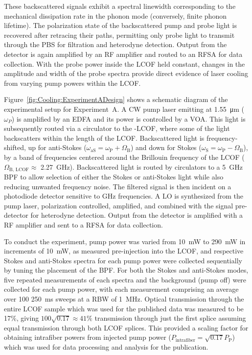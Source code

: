 These backscattered signals exhibit a spectral linewidth corresponding to the mechanical dissipation rate in the phonon mode (conversely, finite phonon lifetime). The polarization state of the backscattered pump and probe light is recovered after retracing their paths, permitting only probe light to transmit through the \ac{PBS} for filtration and heterodyne detection. Output from the detector is again amplified by an \ac{RF} amplifier and routed to an \ac{RFSA} for data collection. With the probe power inside the \ac{LCOF} held constant, changes in the amplitude and width of the probe spectra provide direct evidence of laser cooling from varying pump powers within the \ac{LCOF}.

Figure~\ref{fig:Cooling:ExperimentADesign} shows a schematic diagram of the experimental setup for Experiment~A. A \ac{CW} pump laser emitting at \SI{1.55}{\micro\meter} (\(\omega_{P}\)) is amplified by an \ac{EDFA} and its power is controlled by a \ac{VOA}. This light is subsequently routed via a circulator to the -\ac{LCOF}, where some of the light backscatters within the length of the \ac{LCOF}. Backscattered light is frequency-shifted, up for anti-Stokes (\(\omega_{\mathrm{aS}} = \omega_{\mathrm{P}} + \Omega_{\mathrm{B}}\)) and down for Stokes
(\(\omega_{\mathrm{S}} = \omega_{\mathrm{P}} - \Omega_{\mathrm{B}}\)),
by a band of frequencies centered around the Brillouin frequency of the \ac{LCOF} (\(\Omega_{\mathrm{B,\,LCOF}} \approx\) \SI{2.27}{\giga\hertz}). Backscattered light is routed by circulators to a \SI{5}{\giga\hertz} \ac{BPF} to allow selection of either the Stokes or anti-Stokes light while also reducing unwanted frequency noise. The filtered signal is then incident on a photodiode detector sensitive to \si{\giga\hertz} frequencies. A \ac{LO} is synthesized from the pump laser, polarization controlled, amplified, and combined with the signal pre-detector for heterodyne detection. Output from the detector is amplified with a \ac{RF} amplifier and sent to a \ac{RFSA} for data collection.

To conduct the experiment, pump power was varied from \SI{10}{\milli\watt} to \SI{290}{\milli\watt} in increments of \SI{10}{\milli\watt}, as measured pre-injection into the \ac{LCOF}, and respective Stokes and anti-Stokes spectra for each pump power were collected sequentially by tuning the placement of the \ac{BPF}. For both the Stokes and anti-Stokes modes, five repeated measurements of each spectra and the background (pump off) were collected for each pump power, with each measurement comprising an average over 100 \SI{250}{\milli\second} sweeps at a \ac{RBW} of \SI{1}{\mega\hertz}. Optical transmission through the entire \ac{LCOF} sample which was used for the published data was measured to be 17\%, giving \(100\sqrt{0.17} \approx 41\%\) transmission through just the first splice assuming equal transmission through both \ac{LCOF} splices. This provided a scaling factor for obtaining intrafiber powers from injected pump power (\(P_{\mathrm{intrafiber}} = \sqrt{0.17}P_{\mathrm{P}}\)) which was used for data processing and analysis for the publication.

